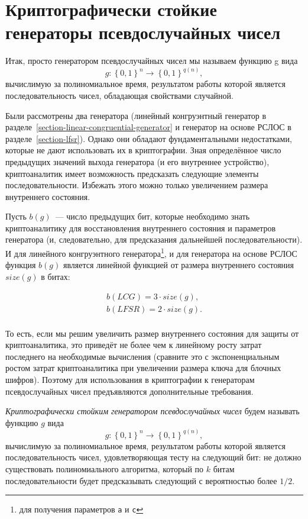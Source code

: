 \section[КСГПСЧ]{Криптографически стойкие генераторы псевдослучайных чисел}\label{section-crypto-random}

Итак, просто генератором псевдослучайных чисел мы называем функцию g вида
	\[g: \left\{0, 1\right\}^{n} \to \left\{0, 1\right\}^{q\left(n\right)},\]
вычислимую за полиномиальное время, результатом работы которой является последовательность чисел, обладающая свойствами случайной.

Были рассмотрены два генератора (линейный конгруэнтный генератор в разделе~\ref{section-linear-congruential-generator} и генератор на основе РСЛОС в разделе~\ref{section-lfsr}). Однако они обладают фундаментальными недостатками, которые не дают использовать их в криптографии. Зная определённое число предыдущих значений выхода генератора (и его внутреннее устройство), криптоаналитик имеет возможность предсказать следующие элементы последовательности. Избежать этого можно только увеличением размера внутреннего состояния.

Пусть $b \left( g \right)$~--- число предыдущих бит, которые необходимо знать криптоаналитику для восстановления внутреннего состояния и параметров генератора (и, следовательно, для предсказания дальнейшей последовательности). И для линейного конгруэнтного генератора\footnote{для получения параметров \texttt{a} и \texttt{c}}, и для генератора на основе РСЛОС функция $b (g)$ является линейной функцией от размера внутреннего состояния $size\left( g \right)$ в битах:

\[\begin{array}{l}
	b \left( LCG \right) = 3 \cdot size\left( g \right), \\
	b \left( LFSR \right) = 2 \cdot size\left( g \right). \\
\end{array}\]

То есть, если мы решим увеличить размер внутреннего состояния для защиты от криптоаналитика, это приведёт не более чем к линейному росту затрат последнего на необходимые вычисления (сравните это с экспоненциальным ростом затрат криптоаналитика при увеличении размера ключа для блочных шифров). Поэтому для использования в криптографии к генераторам псевдослучайных чисел предъявляются дополнительные требования.

\emph{Криптографически стойким генератором псевдослучайных чисел} будем называть функцию $g$ вида
	\[g: \left\{0, 1\right\}^{n} \to \left\{0, 1\right\}^{q\left(n\right)},\] 
вычислимую за полиномиальное время, результатом работы которой является последовательность чисел, удовлетворяющая тесту на следующий бит: не должно существовать полиномиального алгоритма, который по $k$ битам последовательности будет предсказывать следующий с вероятностью более $1/2$.

